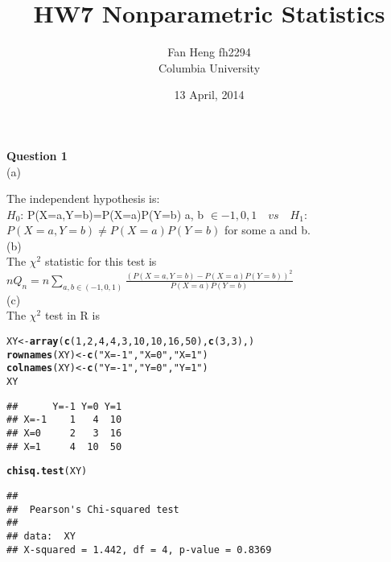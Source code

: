\documentclass{article}\usepackage[]{graphicx}\usepackage[]{color}
\title{HW7 Nonparametric Statistics}
\author{Fan Heng fh2294\\ Columbia University}
\date{13 April, 2014}
\makeatletter
\newcommand{\hlnum}[1]{\textcolor[rgb]{0.686,0.059,0.569}{#1}}%
\newcommand{\hlstr}[1]{\textcolor[rgb]{0.192,0.494,0.8}{#1}}%
\newcommand{\hlstd}[1]{\textcolor[rgb]{0.345,0.345,0.345}{#1}}%
\newcommand{\hlkwb}[1]{\textcolor[rgb]{0.69,0.353,0.396}{#1}}%
\newcommand{\hlkwd}[1]{\textcolor[rgb]{0.737,0.353,0.396}{\textbf{#1}}}%
\newenvironment{kframe}{%
 \def\at@end@of@kframe{}%
 \ifinner\ifhmode%
  \def\at@end@of@kframe{\end{minipage}}%
  \begin{minipage}{\columnwidth}%
 \fi\fi%
 \def\FrameCommand##1{\hskip\@totalleftmargin \hskip-\fboxsep
 \colorbox{shadecolor}{##1}\hskip-\fboxsep
     \hskip-\linewidth \hskip-\@totalleftmargin \hskip\columnwidth}%
 \MakeFramed {\advance\hsize-\width
   \@totalleftmargin\z@ \linewidth\hsize
   \@setminipage}}%
 {\par\unskip\endMakeFramed%
 \at@end@of@kframe}
\newenvironment{knitrout}{}{} %
\makeatother
\begin{document}
\maketitle
 
{\LARGE\bf{Question 1}}\\ %

{\Large{(a)}} 

The independent hypothesis is: \\

$H_0$: P(X=a,Y=b)=P(X=a)P(Y=b) a, b $\in {{-1, 0, 1}}  \quad  vs \quad    H_1:$ $P(X=a,Y=b)\neq P(X=a)P(Y=b)$ for some a and b.\\

{\Large{(b)}} \\

The $\chi ^2$  statistic  for this test is \\

$nQ_n= n\sum_{a,b \in {(-1,0,1)}} \frac{(P(X=a,Y=b)-P(X=a)P(Y=b))^2}{P(X=a)P(Y=b)}$\\

{\Large{(c)}} \\

The $\chi ^2$ test in R is 
\begin{knitrout}
\color{fgcolor}\begin{kframe}
\begin{alltt}
\hlstd{XY} \hlkwb{<-} \hlkwd{array}\hlstd{(}\hlkwd{c}\hlstd{(}\hlnum{1}\hlstd{,} \hlnum{2}\hlstd{,} \hlnum{4}\hlstd{,} \hlnum{4}\hlstd{,} \hlnum{3}\hlstd{,} \hlnum{10}\hlstd{,} \hlnum{10}\hlstd{,} \hlnum{16}\hlstd{,} \hlnum{50}\hlstd{),} \hlkwd{c}\hlstd{(}\hlnum{3}\hlstd{,} \hlnum{3}\hlstd{), )}
\hlkwd{rownames}\hlstd{(XY)} \hlkwb{<-} \hlkwd{c}\hlstd{(}\hlstr{"X=-1"}\hlstd{,} \hlstr{"X=0"}\hlstd{,} \hlstr{"X=1"}\hlstd{)}
\hlkwd{colnames}\hlstd{(XY)} \hlkwb{<-} \hlkwd{c}\hlstd{(}\hlstr{"Y=-1"}\hlstd{,} \hlstr{"Y=0"}\hlstd{,} \hlstr{"Y=1"}\hlstd{)}
\hlstd{XY}
\end{alltt}
\begin{verbatim}
##      Y=-1 Y=0 Y=1
## X=-1    1   4  10
## X=0     2   3  16
## X=1     4  10  50
\end{verbatim}
\begin{alltt}
\hlkwd{chisq.test}\hlstd{(XY)}
\end{alltt}


{\ttfamily\noindent\color{warningcolor}{\#\# Warning: Chi-squared approximation may be incorrect}}\begin{verbatim}
## 
## 	Pearson's Chi-squared test
## 
## data:  XY
## X-squared = 1.442, df = 4, p-value = 0.8369
\end{verbatim}
\end{kframe}
\end{knitrout}
\end{document}

